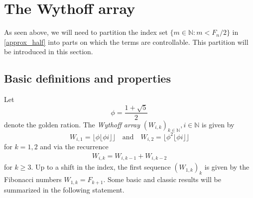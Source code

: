 \documentclass[]{interact}
\newcommand{\bbN}{\mathbb{N}}
\theoremstyle{definition}
\numberwithin{table}{section} %
\numberwithin{figure}{section}
\begin{document}
\section{The Wythoff array} \label{sec:wythoff}

As seen above, we will need to partition the index set $\{m \in \bbN: m < F_n/2\}$ in \eqref{approx_half} into parts on which the terms are controllable. This partition will be introduced in this section.

\subsection{Basic definitions and properties}

Let
$$
\phi = \frac{1+\sqrt5}{2}
$$
denote the golden ration. The \emph{Wythoff array} $(W_{i, k})_{k \in \bbN}, i \in \bbN$ \cite{Mor80} is given by
$$
W_{i, 1} = \lfloor \phi \lfloor \phi i\rfloor\rfloor \quad \text{and} \quad W_{i, 2} = \lfloor \phi^2 \lfloor \phi i\rfloor\rfloor
$$
for $k=1, 2$ and via the recurrence
\begin{align} \label{eq:recurrence}
    W_{i, k} = W_{i, k-1} + W_{i, k-2}
\end{align}
for $k \geq 3$. Up to a shift in the index, the first sequence $(W_{1, k})_k$ is given by the Fibonacci numbers $W_{1, k} = F_{k+1}$. Some basic and classic results will be summarized in the following statement.
\end{document}
